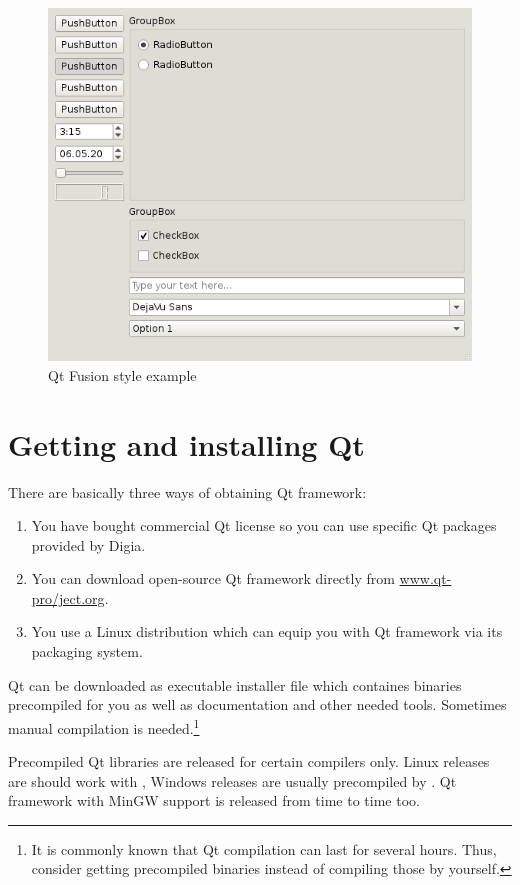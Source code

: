 \begin{figure}[ht]
\centering\includegraphics{graphics/laboratory/01-fusion.png}
\caption{Qt Fusion style example}\label{figure:fusion}
\end{figure}

\section{Getting and installing Qt}
There are basically three ways of obtaining Qt framework:
\begin{enumerate}
\item You have bought commercial Qt license so you can use specific Qt packages provided by Digia.
\item You can download open-source Qt framework directly from \href{http://www.qt-project.org/}{www.qt-pro\-/ject.org}.
\item You use a Linux distribution which can equip you with Qt framework via its packaging system.
\end{enumerate}

Qt can be downloaded as executable installer file which containes binaries precompiled for you as well as documentation and other needed tools. Sometimes manual compilation is needed.\footnote{It is commonly known that Qt compilation can last for several hours. Thus, consider getting precompiled binaries instead of compiling those by yourself.}

Precompiled Qt libraries are released for certain compilers only. Linux releases are should work with , Windows releases are usually precompiled by . Qt framework with MinGW support is released from time to time too.

